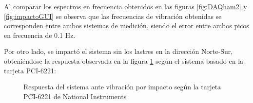 Al comparar los espectros en frecuencia obtenidos en las figuras \ref{fig:DAQham2} y \ref{fig:impactoGUI} se observa que las frecuencias de vibración obtenidas se corresponden entre ambos sistemas de medición, siendo el error entre ambos picos en frecuencia de 0.1 Hz.

Por otro lado, se impactó el sistema sin los lastres en la dirección Norte-Sur, obteniéndose la respuesta observada en la figura \ref{fig:DAQHammerNS} según el sistema basado en la tarjeta PCI-6221:

\begin{figure}[H]
    \centering
    \hfill
    \caption{Respuesta del sistema ante vibración por impacto según la tarjeta PCI-6221 de National Instruments}
    \label{fig:DAQHammerNS}
\end{figure}

